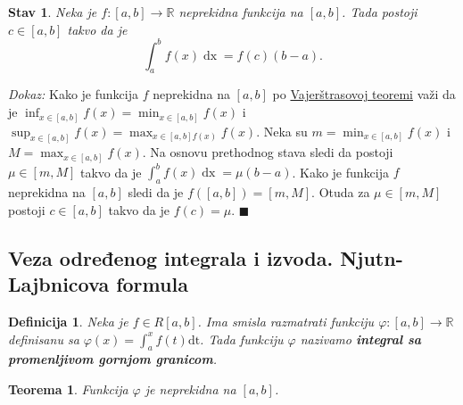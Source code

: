 \documentclass{article}
\newtheorem{definicija}{Definicija}[section]
\newtheorem{teorema}{Teorema}[section]
\newtheorem{stav}{Stav}[section]
\DeclareMathOperator{\dx}{dx}
\begin{document}
\begin{stavbox}
    \label{stav_2.12}
    \begin{stav}
        Neka je $f: \left[a, b\right] \longrightarrow \mathbb{R}$ neprekidna funkcija na $\left[a, b\right]$. Tada postoji $c\in \left[a,b\right]$ takvo da je
        $$ \int^b_a f\left(x\right)\dx = f\left(c\right)\left(b-a\right).$$
    \end{stav}
\end{stavbox}

\textit{Dokaz:} Kako je funkcija $f$ neprekidna na $\left[a, b\right]$ po \hyperref[podsetnik_teoreme_3]{Vajerštrasovoj teoremi} važi da je $\displaystyle \inf_{x\in\left[a,b\right]} f\left(x\right) = \min_{x \in \left[a, b\right]} f\left(x\right)$ i
$\displaystyle \sup_{x\in\left[a,b\right]} f\left(x\right) = \max_{x \in \left[a, b\right] f\left(x\right)}f\left(x\right)$. Neka su $\displaystyle m = \min_{x\in\left[a,b\right]} f\left(x\right)$ i  $\displaystyle M = \max_{x\in\left[a,b\right]} f\left(x\right)$.
Na osnovu prethodnog stava sledi da postoji $\mu \in \left[m, M\right]$ takvo da je $\displaystyle \int^b_a f\left(x\right) \dx = \mu \left(b-a\right)$. Kako je funkcija $f$ neprekidna
na $\left[a, b\right]$ sledi da je $f\left(\left[a,b\right]\right) = \left[m, M\right]$. Otuda za $\mu \in \left[m, M\right]$ postoji $c \in \left[a, b\right]$ takvo da je $f\left(c\right) = \mu$.
\null\hfill $\blacksquare$\par

\subsection{Veza određenog integrala i izvoda. Njutn-Lajbnicova formula}

\begin{defbox}
    \label{definicija_2.13}
    \begin{definicija}
        Neka je $f \in R\left[a, b\right]$. Ima smisla razmatrati funkciju $\varphi:\left[a, b\right] \longrightarrow \mathbb{R}$ definisanu sa $\varphi \left(x\right) = \displaystyle \int^x_a f\left(t\right)\text{dt}$. Tada funkciju
        $\varphi$ nazivamo \textbf{integral sa promenljivom gornjom granicom}.
    \end{definicija}
\end{defbox}

\begin{teoremabox}
    \label{teorema_2.7}
    \begin{teorema}
        Funkcija $\varphi$ je neprekidna na $\left[a, b\right]$.
    \end{teorema}
\end{teoremabox}
\end{document}
